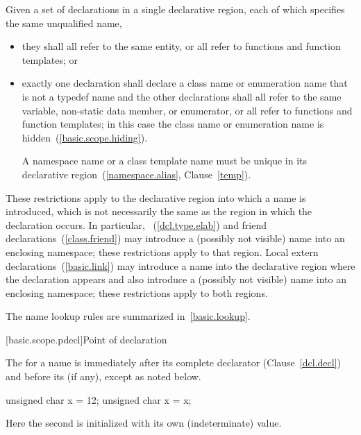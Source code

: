 \pnum
Given a set of declarations in a single declarative region, each of
which specifies the same unqualified name,
\begin{itemize}
\item they shall all refer to the same entity, or all refer to functions
and function templates; or
\item exactly one declaration shall declare a class name or enumeration
name that is not a typedef name and the other declarations shall
all refer to the same variable, non-static data member, or enumerator,
or all refer to functions and function templates;
in this case the class name or enumeration name is
hidden~(\ref{basic.scope.hiding}). \begin{note} A namespace name or a
class template name must be unique in its declarative
region~(\ref{namespace.alias}, Clause~\ref{temp}). \end{note}
\end{itemize}
\begin{note} These restrictions apply to the declarative region into which
a name is introduced, which is not necessarily the same as the region in
which the declaration occurs. In particular,
~(\ref{dcl.type.elab}) and
friend declarations~(\ref{class.friend}) may introduce a (possibly not
visible) name into an enclosing namespace; these restrictions apply to
that region. Local extern declarations~(\ref{basic.link}) may introduce
a name into the declarative region where the declaration appears and
also introduce a (possibly not visible) name into an enclosing
namespace; these restrictions apply to both regions. \end{note}

\pnum
\begin{note} The name lookup rules are summarized in~\ref{basic.lookup}.
\end{note}

[basic.scope.pdecl]{Point of declaration}

\pnum
{}%
The  for a name is immediately after its
complete declarator (Clause~\ref{dcl.decl}) and before its
 (if any), except as noted below. \begin{example}

\begin{codeblock}
unsigned char x = 12;
{ unsigned char x = x; }
\end{codeblock}

Here the second  is initialized with its own (indeterminate)
value. \end{example}

